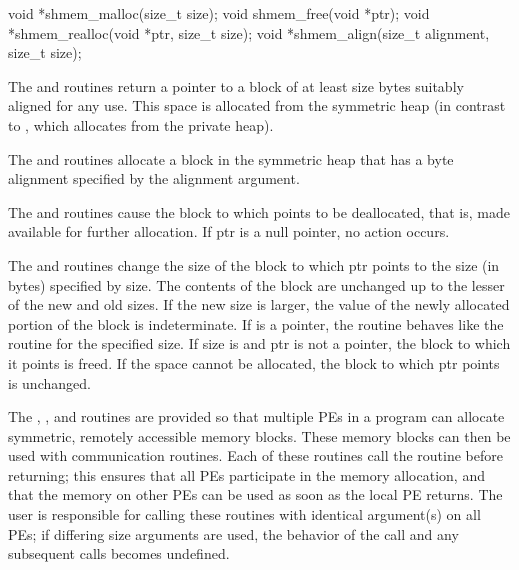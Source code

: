 \synC
void *shmem_malloc(size_t size);
void shmem_free(void *ptr);
void *shmem_realloc(void *ptr, size_t size);
void *shmem_align(size_t alignment, size_t size);%

{
       The and   routines return a pointer to a block of at least size
       bytes suitably aligned for any use.  This space is allocated from the
       symmetric heap (in contrast to , which allocates from the
       private heap).

       The and  routines allocate a block in the symmetric heap that
       has a byte alignment specified by the alignment argument.

       The and  routines cause the block to which  points to be
       deallocated, that is, made available for further allocation.  If ptr is
       a null pointer, no action occurs. 
              
       The  and  routines change the size of the block to which ptr
       points to the size (in bytes) specified by size.  The contents of the
       block are unchanged up to the lesser of the new and old sizes. If the
       new size is larger, the value of the newly allocated portion of the
       block is indeterminate.  
       If  is a  pointer, the  routine behaves like the  routine for the specified size.  If size  is  and ptr is not a  pointer, the block to which it points is freed. If the space cannot be allocated, the block to which ptr points is unchanged.

       The , , and  routines are provided  so that multiple \ac{PE}s in a program can allocate symmetric, remotely
       accessible memory blocks.  These memory blocks can then be used with
       \openshmem communication routines.  Each of these routines call the
        routine before returning; this ensures that all
       \ac{PE}s participate in the memory allocation, and that the memory on other
       \ac{PE}s can be used	as  soon as the local \ac{PE} returns.  The user is
       responsible for calling these routines with identical argument(s) on
       all \ac{PE}s; if differing size arguments are used, the behavior of the call and any subsequent \openshmem calls becomes undefined.
}

